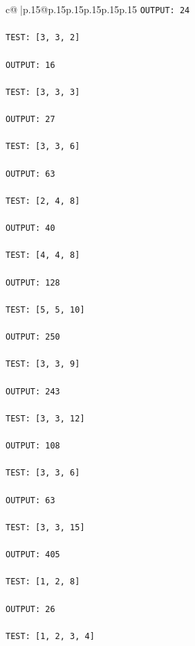\documentclass{article}
\begin{document}
{\begin{supertabular}{c@{$\;$}|p{.15\linewidth}@{}p{.15\linewidth}p{.15\linewidth}p{.15\linewidth}p{.15\linewidth}p{.15\linewidth}}
{{{\texttt{OUTPUT: 24} \\
\\ 
\texttt{TEST: {[}3, 3, 2{]}} \\
\\ 
\texttt{OUTPUT: 16} \\
\\ 
\texttt{TEST: {[}3, 3, 3{]}} \\
\\ 
\texttt{OUTPUT: 27} \\
\\ 
\texttt{TEST: {[}3, 3, 6{]}} \\
\\ 
\texttt{OUTPUT: 63} \\
\\ 
\texttt{TEST: {[}2, 4, 8{]}} \\
\\ 
\texttt{OUTPUT: 40} \\
\\ 
\texttt{TEST: {[}4, 4, 8{]}} \\
\\ 
\texttt{OUTPUT: 128} \\
\\ 
\texttt{TEST: {[}5, 5, 10{]}} \\
\\ 
\texttt{OUTPUT: 250} \\
\\ 
\texttt{TEST: {[}3, 3, 9{]}} \\
\\ 
\texttt{OUTPUT: 243} \\
\\ 
\texttt{TEST: {[}3, 3, 12{]}} \\
\\ 
\texttt{OUTPUT: 108} \\
\\ 
\texttt{TEST: {[}3, 3, 6{]}} \\
\\ 
\texttt{OUTPUT: 63} \\
\\ 
\texttt{TEST: {[}3, 3, 15{]}} \\
\\ 
\texttt{OUTPUT: 405} \\
\\ 
\texttt{TEST: {[}1, 2, 8{]}} \\
\\ 
\texttt{OUTPUT: 26} \\
\\ 
\texttt{TEST: {[}1, 2, 3, 4{]}} \\
}}}
\end{supertabular}}
\end{document}
